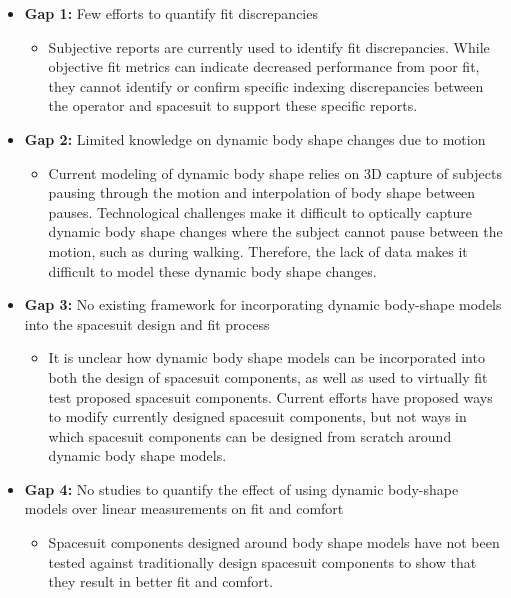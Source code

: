 \documentclass[defaultstyle,11pt]{thesis}
\providecommand{\tightlist}{%
  \setlength{\itemsep}{0pt}\setlength{\parskip}{0pt}}
\begin{document}
\begin{itemize}
\tightlist
\item
  \textbf{Gap 1:} Few efforts to quantify fit discrepancies

  \begin{itemize}
  \tightlist
  \item
    Subjective reports are currently used to identify fit discrepancies.
    While objective fit metrics can indicate decreased performance from poor fit, they cannot identify or confirm specific indexing discrepancies between the operator and spacesuit to support these specific reports.
  \end{itemize}
\item
  \textbf{Gap 2:} Limited knowledge on dynamic body shape changes due to motion

  \begin{itemize}
  \tightlist
  \item
    Current modeling of dynamic body shape relies on 3D capture of subjects pausing through the motion and interpolation of body shape between pauses.
    Technological challenges make it difficult to optically capture dynamic body shape changes where the subject cannot pause between the motion, such as during walking.
    Therefore, the lack of data makes it difficult to model these dynamic body shape changes.
  \end{itemize}
\item
  \textbf{Gap 3:} No existing framework for incorporating dynamic body-shape models into the spacesuit design and fit process

  \begin{itemize}
  \tightlist
  \item
    It is unclear how dynamic body shape models can be incorporated into both the design of spacesuit components, as well as used to virtually fit test proposed spacesuit components.
    Current efforts have proposed ways to modify currently designed spacesuit components, but not ways in which spacesuit components can be designed from scratch around dynamic body shape models.
  \end{itemize}
\item
  \textbf{Gap 4:} No studies to quantify the effect of using dynamic body-shape models over linear measurements on fit and comfort

  \begin{itemize}
  \tightlist
  \item
    Spacesuit components designed around body shape models have not been tested against traditionally design spacesuit components to show that they result in better fit and comfort.
  \end{itemize}
\end{itemize}
\end{document}

